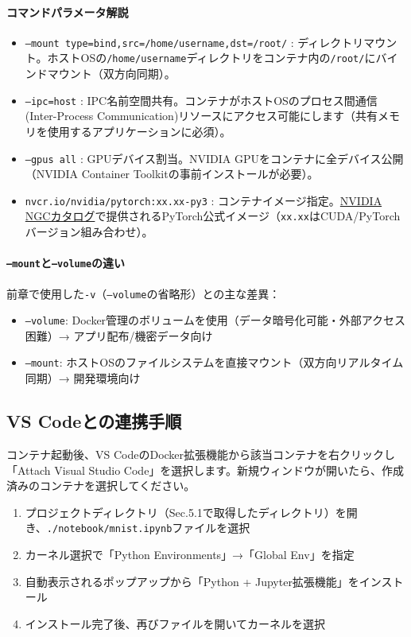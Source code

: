 \paragraph{コマンドパラメータ解説}
\begin{itemize}
\item \texttt{--mount type=bind,src=/home/username,dst=/root/} :
ディレクトリマウント。ホストOSの\texttt{/home/username}ディレクトリをコンテナ内の\texttt{/root/}にバインドマウント（双方向同期）。

\item \texttt{--ipc=host} :
IPC名前空間共有。コンテナがホストOSのプロセス間通信(Inter-Process Communication)リソースにアクセス可能にします（共有メモリを使用するアプリケーションに必須）。

\item \texttt{--gpus all} :
GPUデバイス割当。NVIDIA GPUをコンテナに全デバイス公開（NVIDIA Container Toolkitの事前インストールが必要）。

\item \texttt{nvcr.io/nvidia/pytorch:xx.xx-py3} :
コンテナイメージ指定。\href{https://docs.nvidia.com/deeplearning/frameworks/support-matrix/index.html}{NVIDIA NGCカタログ}で提供されるPyTorch公式イメージ（\texttt{xx.xx}はCUDA/PyTorchバージョン組み合わせ）。
\end{itemize}


\paragraph{\texttt{--mount}と\texttt{--volume}の違い}
前章で使用した\texttt{-v}（\texttt{--volume}の省略形）との主な差異：
\begin{itemize}
\item \texttt{--volume}: Docker管理のボリュームを使用（データ暗号化可能・外部アクセス困難）→ アプリ配布/機密データ向け
\item \texttt{--mount}: ホストOSのファイルシステムを直接マウント（双方向リアルタイム同期）→ 開発環境向け
\end{itemize}

\subsection{VS Codeとの連携手順}
コンテナ起動後、VS CodeのDocker拡張機能から該当コンテナを右クリックし「Attach Visual Studio Code」を選択します。新規ウィンドウが開いたら、作成済みのコンテナを選択してください。

\begin{enumerate}
\item プロジェクトディレクトリ（Sec.5.1で取得したディレクトリ）を開き、\texttt{./notebook/mnist.ipynb}ファイルを選択
\item カーネル選択で「Python Environments」→「Global Env」を指定
\item 自動表示されるポップアップから「Python + Jupyter拡張機能」をインストール
\item インストール完了後、再びファイルを開いてカーネルを選択
\end{enumerate}

